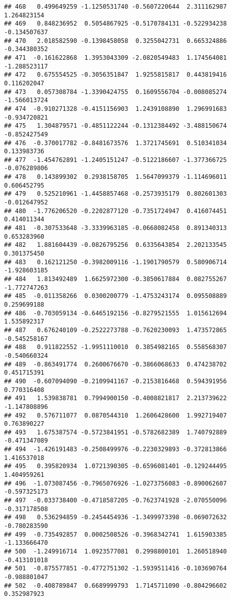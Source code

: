 \documentclass[
]{article}
\begin{document}
\begin{verbatim}
## 468   0.499649259 -1.1250531740 -0.5607220644  2.311162987  1.264823154
## 469   0.848236952  0.5054867925 -0.5170784131 -0.522934238 -0.134507637
## 470   2.018582590 -0.1398458058  0.3255042731  0.665324886 -0.344380352
## 471  -0.161622868  1.3953043309 -2.0820549483  1.174564081 -1.288523117
## 472   0.675554525 -0.3056351847  1.9255815817  0.443819416  0.116202047
## 473   0.057308784 -1.3390424755  0.1609556704 -0.008085274 -1.566013724
## 474  -0.910271328 -0.4151156903  1.2439108890  1.296991683 -0.934720821
## 475   1.304879571 -0.4851122244 -0.1312384492 -3.488150674 -0.852427549
## 476  -0.370017782 -0.8481673576  1.3721745691  0.510341034  0.133983736
## 477  -1.454762891 -1.2405151247 -0.5122186607 -1.377366725 -0.076289806
## 478   0.143899302  0.2938158705  1.5647099379 -1.114696011  0.606452795
## 479   0.525210961 -1.4458857468 -0.2573935179  0.802601303 -0.012647952
## 480  -1.776206520 -0.2202877120 -0.7351724947  0.416074451  0.414011344
## 481  -0.307533648 -3.3339963185 -0.0668082458  0.891340313  0.653283960
## 482   1.881604439 -0.0826795256  0.6335643854  2.202133545  0.301375450
## 483   0.162121250 -0.3982009116 -1.1901790579  0.580906714 -1.928603185
## 484   1.813492489  1.6625972300 -0.3850617884  0.082755267 -1.772747263
## 485  -0.011358266  0.0300200779 -1.4753243174  0.095508889  0.259699188
## 486  -0.703059134 -0.6465192156 -0.8279521555  1.015612694  1.535892317
## 487   0.676240109 -0.2522273788 -0.7620230093  1.473572865 -0.545258167
## 488   0.911822552 -1.9951110010  0.3854982165  0.558568307 -0.540660324
## 489  -0.863491774  0.2600676670 -0.3866068633  0.474238702  0.451715391
## 490  -0.607094090 -0.2109941167 -0.2153816468  0.594391956  0.770316408
## 491   1.539838781  0.7994900150 -0.4008821817  2.213739622 -1.147808896
## 492   0.576711077  0.0870544310  1.2606428600  1.992719407  0.763890227
## 493   1.675387574 -0.5723841951 -0.5782682389  1.740792889 -0.471347089
## 494  -1.426191483 -0.2508499976 -0.2230329893 -0.372813866  1.416537018
## 495   0.395820934  1.0721390305 -0.6596081401 -0.129244495  1.404959261
## 496  -1.073087456 -0.7965076926 -1.0273756083 -0.890062607 -0.597325173
## 497  -0.033738400 -0.4718587205 -0.7623741928 -2.070550096 -0.317178508
## 498   0.536294859 -0.2454454936 -1.3499973398 -0.069072632 -0.780283590
## 499  -0.735492857  0.0002508526 -0.3968342741  1.615903385 -1.133666470
## 500  -1.249916714  1.0923577081  0.2998800101  1.260518940 -0.413101018
## 501  -0.875577851 -0.4772751302 -1.5939511416 -0.103690764 -0.988801047
## 502  -0.408789847  0.6689999793  1.7145711090 -0.804296602  0.352987923

\end{verbatim}
\end{document}
